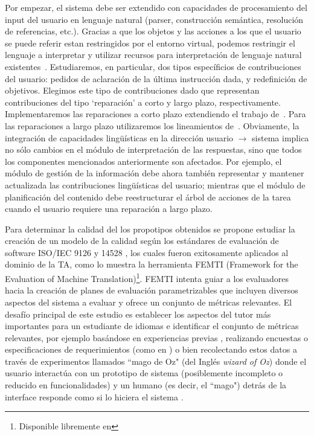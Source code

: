 Por empezar, el sistema debe ser extendido con capacidades de procesamiento
del input del usuario en lenguaje natural (parser, construcci\'on sem\'antica,
resoluci\'on de referencias, etc.).  Gracias a que los objetos y las acciones
a los que el usuario se puede referir estan restringidos por el entorno virtual,
podemos restringir el lenguaje
a interpretar y utilizar recursos para interpretaci\'on de lenguaje natural
existentes~\citep{kow06}.  Estudiaremos, en particular, dos
tipos espec\'ificios de contribuciones del usuario: pedidos de aclaraci\'on
de la \'ultima instrucci\'on dada, y redefinici\'on de objetivos.  Elegimos
este tipo de contribuciones dado que representan contribuciones del tipo
`reparaci\'on' a corto y largo plazo, respectivamente. Implementaremos las
reparaciones a corto plazo extendiendo el trabajo de~\cite{purver06}.  Para
las reparaciones a largo plazo utilizaremos los lineamientos
de~\cite{blaylock05a,blaylock05b}.  Obviamente, la integraci\'on de capacidades
ling\"u\'isticas en la direcci\'on usuario $\to$ sistema implica no s\'olo
cambios en el m\'odulo de interpretaci\'on de las respuestas, sino que todos los componentes mencionados
anteriormente son afectados.  Por ejemplo, el m\'odulo de gesti\'on de la
informaci\'on debe ahora tambi\'en representar y mantener actualizada las
contribuciones ling\"u\'isticas del usuario; mientras que el m\'odulo de
planificaci\'on del contenido debe reestructurar el \'arbol de acciones
de la tarea cuando el usuario requiere una reparaci\'on a largo plazo.

Para determinar la calidad del los propotipos obtenidos se propone
estudiar la creaci\'on de un modelo de la calidad seg\'un los est\'andares de
evaluaci\'on de software ISO/IEC 9126 y 14528 \citep{ISO9126-1, ISO14598-1}, los
cuales fueron exitosamente aplicados al dominio de la TA, como lo muestra la
herramienta FEMTI (Framework for the Evaluation of Machine
Translation)\footnote{Disponible libremente en }. FEMTI
\citep{Est2005} intenta guiar a los evaluadores hacia la creaci\'on de planes de
evaluaci\'on parametrizables que incluyen diversos aspectos del sistema a evaluar
y ofrece un conjunto de m\'etricas relevantes. El desaf\'io principal de este
estudio es establecer los aspectos del tutor m\'as importantes para un
estudiante de idiomas e identificar el conjunto de m\'etricas relevantes, por
ejemplo bas\'andose en experiencias previas \citep{paradise06, Chu2000,
Litman2002}, realizando encuestas o especificaciones de requerimientos (como en
\citep{Lecoeuche98}) o bien recolectando estos datos a trav\'es de experimentos
llamados ``mago de Oz" (del Ingl\'es \textit{wizard of Oz}) donde el usuario
interact\'ua con un prototipo de sistema (posiblemente incompleto o reducido en
funcionalidades) y un humano (es decir, el ``mago") detr\'as de la interface
responde como si lo hiciera el sistema \citep{Dahlback93, Fabbrizio05}.

